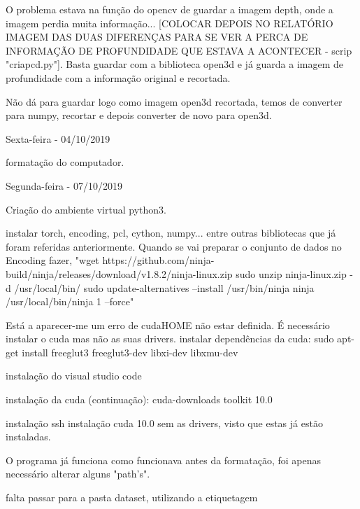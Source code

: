         O problema estava na função do opencv de guardar a imagem depth, onde a imagem perdia muita informação... [COLOCAR DEPOIS NO RELATÓRIO IMAGEM DAS DUAS DIFERENÇAS PARA SE VER A PERCA DE INFORMAÇÃO DE PROFUNDIDADE QUE ESTAVA A ACONTECER - scrip "criapcd.py"]. Basta guardar com a biblioteca open3d e já guarda a imagem de profundidade com a informação original e recortada.
        
        Não dá para guardar logo como imagem open3d recortada, temos de converter para numpy, recortar e depois converter de novo para open3d.
        
        
        
        \bigskip
        
        Sexta-feira - 04/10/2019
        
        formatação do computador.
        
        
        \bigskip
        
        Segunda-feira - 07/10/2019
        
        Criação do ambiente virtual python3.
        
        instalar torch, encoding, pcl, cython, numpy... entre outras bibliotecas que já foram referidas anteriormente.
        Quando se vai preparar o conjunto de dados no Encoding fazer,
        "wget https://github.com/ninja-build/ninja/releases/download/v1.8.2/ninja-linux.zip
        sudo unzip ninja-linux.zip -d /usr/local/bin/
        sudo update-alternatives --install /usr/bin/ninja ninja /usr/local/bin/ninja 1 --force"
        
        Está a aparecer-me um erro de cudaHOME não estar definida. É necessário instalar o cuda mas não as suas drivers.
        instalar dependências da cuda:
            sudo apt-get install freeglut3 freeglut3-dev libxi-dev libxmu-dev
            
        instalação do visual studio code
        
        instalação da cuda (continuação):
            cuda-downloads toolkit 10.0
            
        instalação ssh  
        instalação cuda 10.0 sem as drivers, visto que estas já estão instaladas.
        
        O programa já funciona como funcionava antes da formatação, foi apenas necessário alterar alguns "path's".
        
        
        falta passar para a pasta dataset, utilizando a etiquetagem
        
